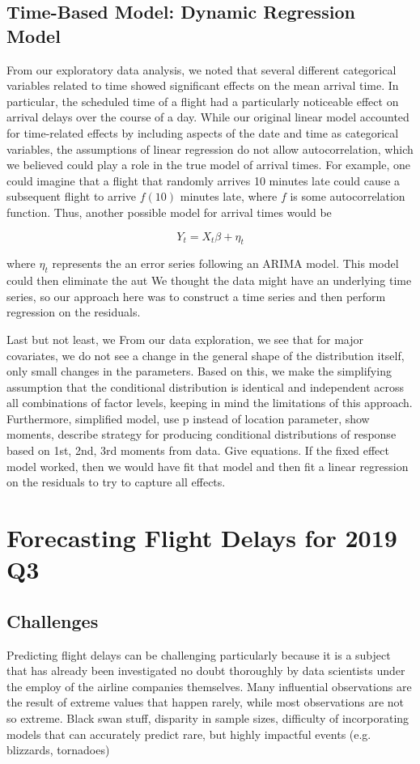 \documentclass[12pt, a4paper]{book}
\newcommand\tab[1][1cm]{\hspace*{#1}}
\begin{document}
		
	\section{Time-Based Model: Dynamic Regression Model}
	\tab From our exploratory data analysis, we noted that several different categorical variables related to time showed significant effects on the mean arrival time. In particular, the scheduled time of a flight had a particularly noticeable effect on arrival delays over the course of a day. While our original linear model accounted for time-related effects by including aspects of the date and time as categorical variables, the assumptions of linear regression do not allow autocorrelation, which we believed could play a role in the true model of arrival times. For example, one could imagine that a flight that randomly arrives 10 minutes late could cause a subsequent flight to arrive $f(10)$ minutes late, where $f$ is some autocorrelation function. Thus, another possible model for arrival times would be 
	\begin{center}
	$$Y_t = X_t\beta + \eta_t$$
	\end{center}
	where $\eta_t$ represents the an error series following an ARIMA model. This model could then eliminate the aut We thought the data might have an underlying time series, so our approach here was to construct a time series and then perform regression on the residuals. 

	\tab Last but not least, we   From our data exploration, we see that for major covariates, we do not see a change in the general shape of the distribution itself, only small changes in the parameters. Based on this, we make the simplifying assumption that the conditional distribution is identical and independent across all combinations of factor levels, keeping in mind the limitations of this approach.  Furthermore, simplified model, use p instead of location parameter, show moments, describe strategy for producing conditional distributions of response based on 1st, 2nd, 3rd moments from data. Give equations. If the fixed effect model worked, then we would have fit that model and then fit a linear regression on the residuals to try to capture all effects. \\
	

\chapter{Forecasting Flight Delays for 2019 Q3}
	\section{Challenges}
	\tab Predicting flight delays can be challenging particularly because it is a subject that has already been investigated no doubt thoroughly by data scientists under the employ of the airline companies themselves. Many influential observations are the result of extreme values that happen rarely, while most observations are not so extreme. Black swan stuff, disparity in sample sizes, difficulty of incorporating models that can accurately predict rare, but highly impactful events (e.g. blizzards, tornadoes)
\end{document}
